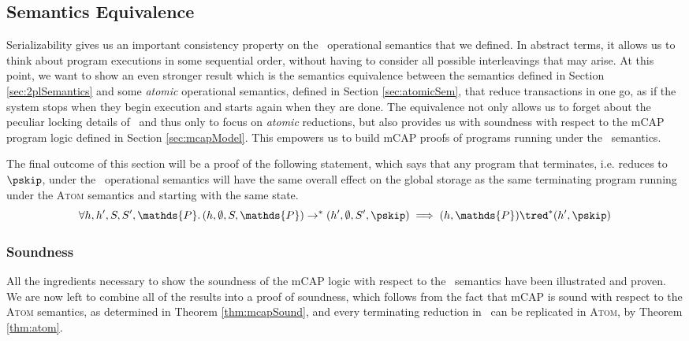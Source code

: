 \subsection{Semantics Equivalence}

Serializability gives us an important consistency property on the \tpl\ operational semantics that we defined. In abstract terms, it allows us to think about program executions in some sequential order, without having to consider all possible interleavings that may arise. At this point, we want to show an even stronger result which is the semantics equivalence between the semantics defined in Section \ref{sec:2plSemantics} and some \textit{atomic} operational semantics, defined in Section \ref{sec:atomicSem}, that reduce transactions in one go, as if the system stops when they begin execution and starts again when they are done. The equivalence not only allows us to forget about the peculiar locking details of \tpl\ and thus only to focus on \textit{atomic} reductions, but also provides us with soundness with respect to the mCAP program logic defined in Section \ref{sec:mcapModel}. This empowers us to build mCAP proofs of programs running under the \tpl\ semantics.

The final outcome of this section will be a proof of the following statement, which says that any program that terminates, i.e. reduces to $\pskip$, under the \tpl\ operational semantics will have the same overall effect on the global storage as the same terminating program running under the \textsc{Atom} semantics and starting with the same state.
\[
	\forall h, h', S, S', \mathds{P} \ldotp
	(h, \emptyset, S, \mathds{P}) \rightarrow^* (h', \emptyset, S', \pskip) \implies 
	(h, \mathds{P}) \tred^* (h', \pskip)
\]









\iffalse
\subsubsection{Soundness}

All the ingredients necessary to show the soundness of the mCAP logic with respect to the \tpl\ semantics have been illustrated and proven. We are now left to combine all of the results into a proof of soundness, which follows from the fact that mCAP is sound with respect to the \textsc{Atom} semantics, as determined in Theorem \ref{thm:mcapSound}, and every terminating reduction in \tpl\ can be replicated in \textsc{Atom}, by Theorem \ref{thm:atom}.


